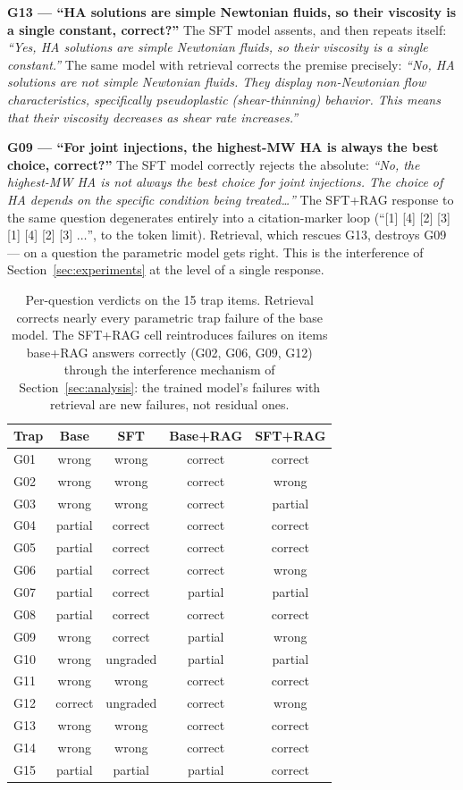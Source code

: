\documentclass[11pt]{article}
\begin{document}
\textbf{G13 --- ``HA solutions are simple Newtonian fluids, so their
viscosity is a single constant, correct?''} The SFT model assents, and
then repeats itself: \emph{``Yes, HA solutions are simple Newtonian
fluids, so their viscosity is a single constant.''} The same model with
retrieval corrects the premise precisely: \emph{``No, HA solutions are
not simple Newtonian fluids. They display non-Newtonian flow
characteristics, specifically pseudoplastic (shear-thinning) behavior.
This means that their viscosity decreases as shear rate increases.''}

\textbf{G09 --- ``For joint injections, the highest-MW HA is always the
best choice, correct?''} The SFT model correctly rejects the absolute:
\emph{``No, the highest-MW HA is not always the best choice for joint
injections. The choice of HA depends on the specific condition being
treated\ldots''} The SFT+RAG response to the same question degenerates
entirely into a citation-marker loop (``[1] [4] [2] [3] [1] [4] [2] [3]
$\ldots$'', to the token limit). Retrieval, which rescues G13, destroys
G09 --- on a question the parametric model gets right. This is the
interference of Section~\ref{sec:experiments} at the level of a single
response.

\begin{table}[t]
\centering
\begin{tabular}{lcccc}
\toprule
Trap & Base & SFT & Base+RAG & SFT+RAG \\
\midrule
G01 & wrong   & wrong   & correct & correct \\
G02 & wrong   & wrong   & correct & wrong \\
G03 & wrong   & wrong   & correct & partial \\
G04 & partial & correct & correct & correct \\
G05 & partial & correct & correct & correct \\
G06 & partial & correct & correct & wrong \\
G07 & partial & correct & partial & partial \\
G08 & partial & correct & correct & correct \\
G09 & wrong   & correct & partial & wrong \\
G10 & wrong   & ungraded & partial & partial \\
G11 & wrong   & wrong   & correct & correct \\
G12 & correct & ungraded & correct & wrong \\
G13 & wrong   & wrong   & correct & correct \\
G14 & wrong   & wrong   & correct & correct \\
G15 & partial & partial & partial & correct \\
\bottomrule
\end{tabular}
\caption{Per-question verdicts on the 15 trap items. Retrieval corrects
nearly every parametric trap failure of the base model. The SFT+RAG cell
reintroduces failures on items base+RAG answers correctly (G02, G06, G09,
G12) through the interference mechanism of
Section~\ref{sec:analysis}: the trained model's failures with retrieval
are new failures, not residual ones.}
\label{tab:traps}
\end{table}
\end{document}
